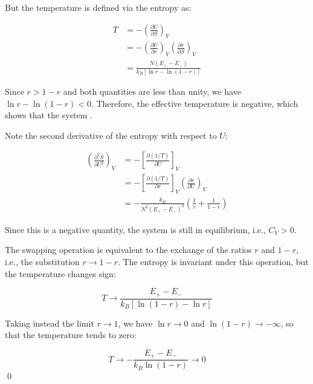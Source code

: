 \documentclass[12pt]{article}
\begin{document}
But the temperature is defined via the entropy as:

\begin{equation}
    \begin{split}
        T &= -\left( \frac{\partial U}{\partial S} \right)_{V} \\
        &= -\left( \frac{\partial U}{\partial r} \right)_{V} \left( \frac{\partial r}{\partial S} \right)_{V} \\
        &= \frac{N(E_{+} - E_{-})}{k_{B} [\ln{r} - \ln{(1-r)}]}
    \end{split}
\end{equation}

Since $r > 1 - r$ and both quantities are less than unity, we have $\ln{r} - \ln{(1-r)} < 0$. Therefore, the effective temperature is negative, which shows that the system .

\begin{correction}
    Note the second derivative of the entropy with respect to $U$:

    \begin{equation}
        \begin{split}
            \left( \frac{\partial^{2} S}{\partial U^{2}} \right)_{V} &= -\left[ \frac{\partial (1/T)}{\partial U} \right]_{V} \\
            &= -\left[ \frac{\partial (1/T)}{\partial r} \right]_{V} \left( \frac{\partial r}{\partial U} \right)_{V} \\
            &= -\frac{k_{B}}{N^{2}(E_{+} - E_{-})^{2}} \left( \frac{1}{r} + \frac{1}{1 - r} \right)
        \end{split}
    \end{equation}

    Since this is a negative quantity, the system is still in equilibrium, i.e., $C_{V} > 0$.
\end{correction}

The swapping operation is equivalent to the exchange of the ratios $r$ and $1-r$, i.e., the substitution $r \to 1-r$. The entropy is invariant under this operation, but the temperature changes sign:

\begin{equation}
    T \to \frac{E_{+} - E_{-}}{k_{B} [\ln{(1-r)} - \ln{r}]}
\end{equation}

Taking instead the limit $r \to 1$, we have $\ln{r} \to 0$ and $\ln{(1-r)} \to -\infty$, so that the temperature tends to zero:

\begin{equation}
    T \to -\frac{E_{+} - E_{-}}{k_{B} \ln{(1-r)}} \to 0
\end{equation}
\qed
\end{document}

